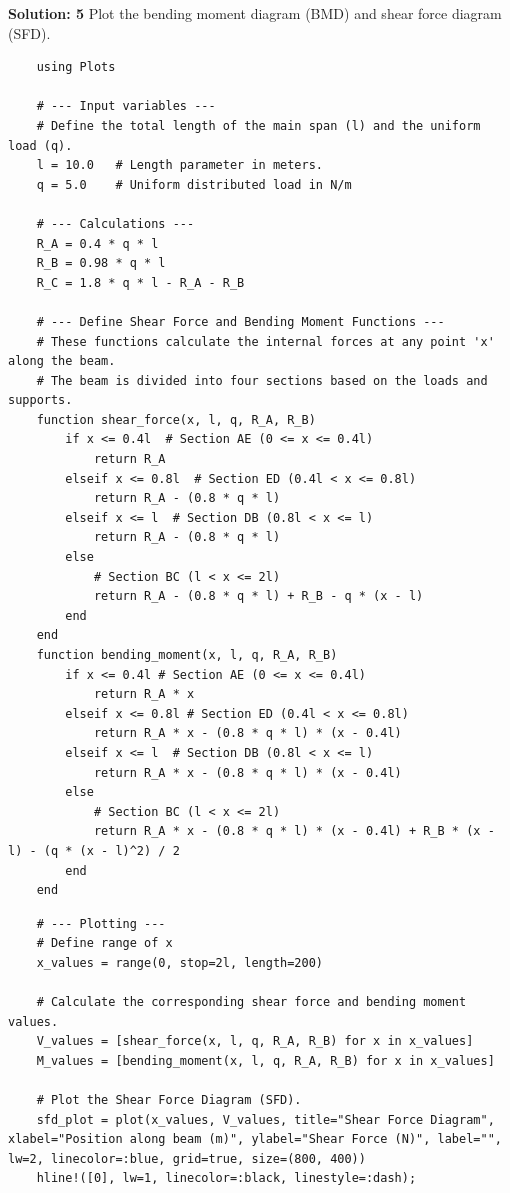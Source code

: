 \documentclass{homework}
\begin{document}
\begin{solution}
    \textbf{Solution: 5}
    Plot the bending moment diagram (BMD) and shear force diagram (SFD). 
    \begin{verbatim}
    using Plots

    # --- Input variables ---
    # Define the total length of the main span (l) and the uniform load (q).
    l = 10.0   # Length parameter in meters.
    q = 5.0    # Uniform distributed load in N/m

    # --- Calculations ---
    R_A = 0.4 * q * l
    R_B = 0.98 * q * l 
    R_C = 1.8 * q * l - R_A - R_B

    # --- Define Shear Force and Bending Moment Functions ---
    # These functions calculate the internal forces at any point 'x' along the beam.
    # The beam is divided into four sections based on the loads and supports.
    function shear_force(x, l, q, R_A, R_B)
        if x <= 0.4l  # Section AE (0 <= x <= 0.4l)
            return R_A
        elseif x <= 0.8l  # Section ED (0.4l < x <= 0.8l)
            return R_A - (0.8 * q * l)
        elseif x <= l  # Section DB (0.8l < x <= l)
            return R_A - (0.8 * q * l)
        else
            # Section BC (l < x <= 2l)
            return R_A - (0.8 * q * l) + R_B - q * (x - l)
        end
    end
    function bending_moment(x, l, q, R_A, R_B)
        if x <= 0.4l # Section AE (0 <= x <= 0.4l)
            return R_A * x
        elseif x <= 0.8l # Section ED (0.4l < x <= 0.8l)
            return R_A * x - (0.8 * q * l) * (x - 0.4l)
        elseif x <= l  # Section DB (0.8l < x <= l)
            return R_A * x - (0.8 * q * l) * (x - 0.4l)
        else
            # Section BC (l < x <= 2l)
            return R_A * x - (0.8 * q * l) * (x - 0.4l) + R_B * (x - l) - (q * (x - l)^2) / 2
        end
    end
    \end{verbatim}
    \begin{verbatim}
    # --- Plotting ---
    # Define range of x
    x_values = range(0, stop=2l, length=200)
    
    # Calculate the corresponding shear force and bending moment values.
    V_values = [shear_force(x, l, q, R_A, R_B) for x in x_values]
    M_values = [bending_moment(x, l, q, R_A, R_B) for x in x_values]
    
    # Plot the Shear Force Diagram (SFD).
    sfd_plot = plot(x_values, V_values, title="Shear Force Diagram", xlabel="Position along beam (m)", ylabel="Shear Force (N)", label="", lw=2, linecolor=:blue, grid=true, size=(800, 400))
    hline!([0], lw=1, linecolor=:black, linestyle=:dash);
    

\end{verbatim}
\end{solution}
\end{document}
